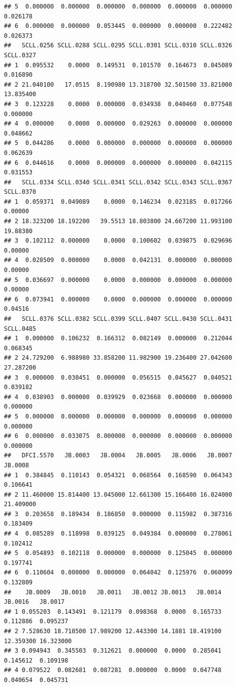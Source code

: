 \documentclass[
]{article}
\begin{document}
\begin{verbatim}
## 5  0.000000  0.000000  0.000000  0.000000  0.000000  0.000000  0.026178
## 6  0.000000  0.000000  0.053445  0.000000  0.000000  0.222482  0.026373
##   SCLL.0256 SCLL.0288 SCLL.0295 SCLL.0301 SCLL.0310 SCLL.0326 SCLL.0327
## 1  0.095532    0.0000  0.149531  0.101570  0.164673  0.045089  0.016890
## 2 21.040100   17.0515  8.190980 13.318700 32.501500 33.821000 13.835400
## 3  0.123228    0.0000  0.000000  0.034938  0.040460  0.077548  0.000000
## 4  0.000000    0.0000  0.000000  0.029263  0.000000  0.000000  0.048662
## 5  0.044286    0.0000  0.000000  0.000000  0.000000  0.000000  0.062639
## 6  0.044616    0.0000  0.000000  0.000000  0.000000  0.042115  0.031553
##   SCLL.0334 SCLL.0340 SCLL.0341 SCLL.0342 SCLL.0343 SCLL.0367 SCLL.0370
## 1  0.059371  0.049089    0.0000  0.146234  0.023185  0.017266   0.00000
## 2 18.323200 18.192200   39.5513 18.803800 24.667200 11.993100  19.88380
## 3  0.102112  0.000000    0.0000  0.100602  0.039875  0.029696   0.00000
## 4  0.028509  0.000000    0.0000  0.042131  0.000000  0.000000   0.00000
## 5  0.036697  0.000000    0.0000  0.000000  0.000000  0.000000   0.00000
## 6  0.073941  0.000000    0.0000  0.000000  0.000000  0.000000   0.04516
##   SCLL.0376 SCLL.0382 SCLL.0399 SCLL.0407 SCLL.0430 SCLL.0431 SCLL.0485
## 1  0.000000  0.106232  0.166312  0.082149  0.000000  0.212044  0.068345
## 2 24.729200  6.988980 33.858200 11.982900 19.236400 27.042600 27.287200
## 3  0.000000  0.030451  0.000000  0.056515  0.045627  0.040521  0.039182
## 4  0.038903  0.000000  0.039929  0.023668  0.000000  0.000000  0.000000
## 5  0.000000  0.000000  0.000000  0.000000  0.000000  0.000000  0.000000
## 6  0.000000  0.033075  0.000000  0.000000  0.000000  0.000000  0.000000
##   DFCI.5570   JB.0003   JB.0004   JB.0005   JB.0006   JB.0007   JB.0008
## 1  0.384845  0.110143  0.054321  0.068564  0.168590  0.064343  0.106641
## 2 11.460000 15.814400 13.045000 12.661300 15.166400 16.024000 21.409000
## 3  0.203658  0.189434  0.186850  0.000000  0.115982  0.387316  0.183409
## 4  0.085289  0.118998  0.039125  0.049384  0.000000  0.278061  0.102412
## 5  0.054893  0.102118  0.000000  0.000000  0.125045  0.000000  0.197741
## 6  0.110604  0.000000  0.000000  0.064042  0.125976  0.060099  0.132809
##    JB.0009   JB.0010   JB.0011   JB.0012 JB.0013   JB.0014   JB.0016   JB.0017
## 1 0.055203  0.143491  0.121179  0.098368  0.0000  0.165733  0.112886  0.095237
## 2 7.528630 18.718500 17.989200 12.443300 14.1881 18.419100 12.359300 16.323000
## 3 0.094943  0.345503  0.312621  0.000000  0.0000  0.285041  0.145612  0.109198
## 4 0.079522  0.082681  0.087281  0.000000  0.0000  0.047748  0.040654  0.045731

\end{verbatim}
\end{document}
